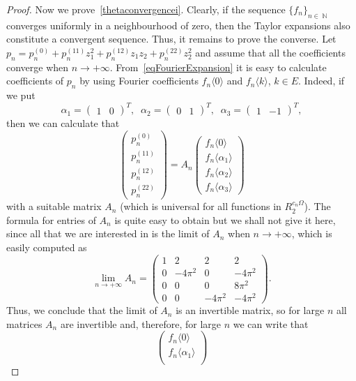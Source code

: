 \documentclass{amsart}
\numberwithin{equation}{section}
\theoremstyle{definition}
\theoremstyle{remark}
\DeclareMathOperator{\NN}{\mathbb N}
\begin{document}
\begin{proof}
		Now we prove~\ref{thetaconvergencei}. Clearly, if the sequence $\{f_n\}_{n \in \NN}$ converges uniformly in a neighbourhood of zero, then the Taylor expansions also constitute a convergent sequence. Thus, it remains to prove the converse. Let $p_n = p_n^{(0)} + p_n^{(11)}z_1^2 + p_n^{(12)}z_1z_2 + p_n^{(22)}z_2^2$ and assume that all the coefficients converge when $n \to +\infty$. From~\eqref{eqFourierExpansion} it is easy to calculate coefficients of $p_n$ by using Fourier coefficients $f_n \langle 0\rangle$ and $f_n\langle k\rangle$, $k \in E$. Indeed, if we put
		\[
		\alpha_1 = \begin{pmatrix}
			1 & 0
		\end{pmatrix}^T,\;\;\alpha_2 = \begin{pmatrix}
			0 & 1
		\end{pmatrix}^T,\;\;\alpha_3 = \begin{pmatrix}
			1 & -1
		\end{pmatrix}^T,
		\]
		then we can calculate that
		\[
		\begin{pmatrix}
			p_n^{(0)} \\ p_n^{(11)} \\ p_n^{(12)} \\ p_n^{(22)}
		\end{pmatrix} = A_n\begin{pmatrix}
			f_n\langle 0\rangle \\ f_n\langle \alpha_1 \rangle \\
			f_n\langle \alpha_2 \rangle \\ f_n\langle \alpha_3 \rangle
		\end{pmatrix}
		\]
		with a suitable matrix $A_n$ (which is universal for all functions in $R_2^{c_n\Omega}$). The formula for entries of $A_n$ is quite easy to obtain but we shall not give it here, since all that we are interested in is the limit of $A_n$ when $n \to +\infty$, which is easily computed as
		\[
		\lim_{n \to +\infty} A_n = \begin{pmatrix}
			1 & 2 & 2 & 2 \\
			0 & -4\pi^2 & 0 & -4\pi^2\\
			0 & 0 & 0 & 8\pi^2\\
			0 & 0 & -4\pi^2 & -4\pi^2
		\end{pmatrix}.
		\]
		Thus, we conclude that the limit of $A_n$ is an invertible matrix, so for large $n$ all matrices $A_n$ are invertible and, therefore, for large $n$ we can write that \[
		\begin{pmatrix}
			f_n\langle 0\rangle \\ f_n\langle \alpha_1 \rangle \\

\end{pmatrix}\]
\end{proof}
\end{document}
